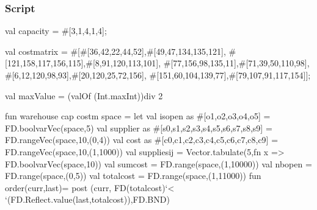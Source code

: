 \documentclass[a4paper]{scrartcl}
\begin{document}
\subsubsection{Script}
\begin{myverbatim}
val capacity = #[3,1,4,1,4];

val costmatrix = 
    #[#[36,42,22,44,52],#[49,47,134,135,121],
      #[121,158,117,156,115],#[8,91,120,113,101],
      #[77,156,98,135,11],#[71,39,50,110,98],
      #[6,12,120,98,93],#[20,120,25,72,156],
      #[151,60,104,139,77],#[79,107,91,117,154]];
                   
val maxValue = (valOf (Int.maxInt))div 2

fun warehouse cap costm space =
    let
       val isopen as #[o1,o2,o3,o4,o5] = 
                          FD.boolvarVec(space,5)
       val supplier as #[s0,s1,s2,s3,s4,s5,s6,s7,s8,s9] = 
                          FD.rangeVec(space,10,(0,4))
       val cost as #[c0,c1,c2,c3,c4,c5,c6,c7,c8,c9] = 
                          FD.rangeVec(space,10,(1,1000))
       val suppliesij = Vector.tabulate(5,fn x => 
                          FD.boolvarVec(space,10))
       val sumcost = FD.range(space,(1,10000))
       val nbopen = FD.range(space,(0,5))
       val totalcost = FD.range(space,(1,11000))
       fun order(curr,last)=
           post (curr, FD(totalcost)`< 
                 `(FD.Reflect.value(last,totalcost)),FD.BND)
                  

\end{myverbatim}
\end{document}
